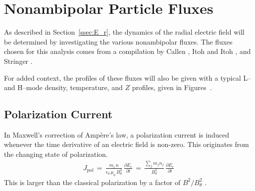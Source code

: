 \section{Nonambipolar Particle Fluxes}\label{sec:nonambipolar_fluxes}
As described in Section~\ref{ssec:E_r}, the dynamics of the radial electric field will be determined by investigating the various nonambipolar fluxes.
The fluxes chosen for this analysis comes from a compilation by Callen \cite{callen_toroidal_2009}, Itoh and Itoh \cite{itoh_role_1996}, and Stringer \cite{stringer_explanation_1993}.

For added context, the profiles of these fluxes will also be given with a typical L-- and H--mode density, temperature, and $Z$ profiles, given in Figures~.

\subsection{Polarization Current}\label{ssec:polarization_current}
In Maxwell's correction of Amp\`ere's law, a polarization current is induced whenever the time derivative of an electric field is non-zero.
This originates from the changing state of polarization.
\begin{align} %
	J_\text{pol} \,=\, \frac{m_i \, n}{\epsilon_0\,\mu_0 \, B_\theta^2} \, \frac{\partial E_r}{\partial t}
		\,=\, \frac{\sum_j m_j n_j}{B_\theta^2} \, \frac{\partial E_r}{\partial t}
		\label{eq:polarization_current_original}
\end{align}
This is larger than the classical polarization by a factor of $B^2 / B_\theta^2$ \cite{hinton_neoclassical_1984}.

